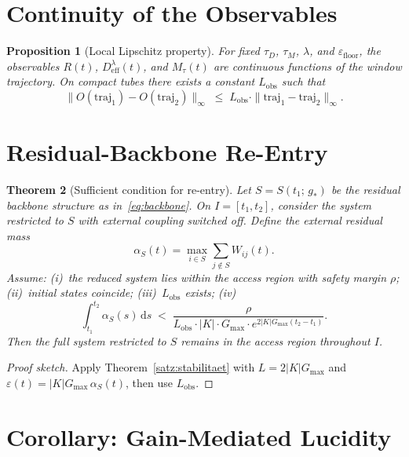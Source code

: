 \documentclass[11pt,a4paper]{article}
\theoremstyle{plain}
\newtheorem{theorem}{Theorem}[section]
\newtheorem{proposition}[theorem]{Proposition}
\theoremstyle{definition}
\theoremstyle{remark}
\newcommand{\Deff}{D_{\mathrm{eff}}}
\newcommand{\Mtau}{M_{\tau}}
\newcommand{\Gmax}{G_{\max}}
\newcommand{\Lobs}{L_{\mathrm{obs}}}
\begin{document}
\section{Continuity of the Observables}

\begin{proposition}[Local Lipschitz property]
\label{prop:stetigkeit}
For fixed $\tau_D$, $\tau_M$, $\lambda$, and $\varepsilon_{\mathrm{floor}}$, the observables $R(t)$, $\Deff^{\lambda}(t)$, and $\Mtau(t)$ are continuous functions of the window trajectory. On compact tubes there exists a constant $\Lobs$ such that
\begin{equation}
\label{eq:Lobs}
\|O(\mathrm{traj}_1) - O(\mathrm{traj}_2)\|_{\infty} \;\leq\; \Lobs \cdot \|\mathrm{traj}_1 - \mathrm{traj}_2\|_{\infty}.
\end{equation}
\end{proposition}

\section{Residual-Backbone Re-Entry}

\begin{theorem}[Sufficient condition for re-entry]
\label{satz:reentry}
Let $S = S(t_1;\,g_*)$ be the residual backbone structure as in~\eqref{eq:backbone}. On $I = [t_1,t_2]$, consider the system restricted to $S$ with external coupling switched off. Define the external residual mass
\begin{equation}
\alpha_S(t) = \max_{i \in S}\sum_{j \notin S} W_{ij}(t).
\end{equation}
Assume: (i)~the reduced system lies within the access region with safety margin $\rho$; (ii)~initial states coincide; (iii)~$\Lobs$ exists; (iv)~
\begin{equation}
\label{eq:eta}
\int_{t_1}^{t_2} \alpha_S(s)\,\mathrm{d}s \;<\; \frac{\rho}{\Lobs \cdot |K| \cdot \Gmax \cdot e^{2|K|\Gmax(t_2 - t_1)}}.
\end{equation}
Then the full system restricted to $S$ remains in the access region throughout $I$.
\end{theorem}

\begin{proof}[Proof sketch]
Apply Theorem~\ref{satz:stabilitaet} with $L = 2|K|\Gmax$ and $\varepsilon(t) = |K|\Gmax\,\alpha_S(t)$, then use $\Lobs$.
\end{proof}

\section{Corollary: Gain-Mediated Lucidity}
\end{document}
